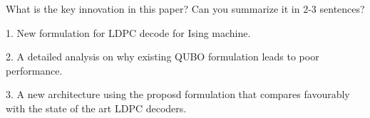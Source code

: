 What is the key innovation in this paper? Can you summarize it in 2-3 sentences?

1. New formulation for LDPC decode for Ising machine.

2. A detailed analysis on why existing
QUBO formulation leads to poor performance.

3. A new architecture using the proposd formulation that compares favourably with the state of the art LDPC decoders.
